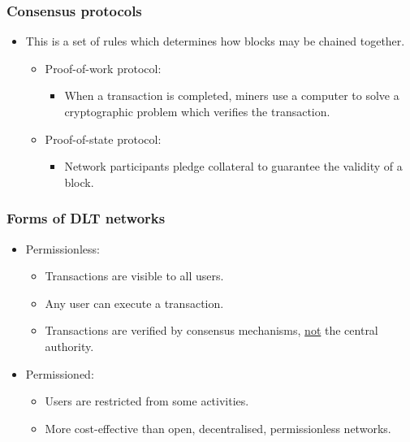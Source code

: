 \documentclass[../notes_compiled.tex]{subfiles}
\begin{document}
\subsubsection*{Consensus protocols}
\begin{itemize}
\item This is a set of rules which determines how blocks may be chained together.
\begin{itemize}
\item Proof-of-work protocol:
\begin{itemize}
\item When a transaction is completed, miners use a computer to solve a cryptographic problem which verifies the transaction.
\end{itemize}
\item Proof-of-state protocol:
\begin{itemize}
\item Network participants pledge collateral to guarantee the validity of a block.
\end{itemize}
\end{itemize}
\end{itemize}

\subsubsection*{Forms of DLT networks}
\begin{itemize}
\item Permissionless:
\begin{itemize}
\item Transactions are visible to all users.
\item Any user can execute a transaction.
\item Transactions are verified by consensus mechanisms, \underline{not} the central authority.
\end{itemize}
\item Permissioned:
\begin{itemize}
\item Users are restricted from some activities.
\item More cost-effective than open, decentralised, permissionless networks.
\end{itemize}
\end{itemize}
\end{document}
